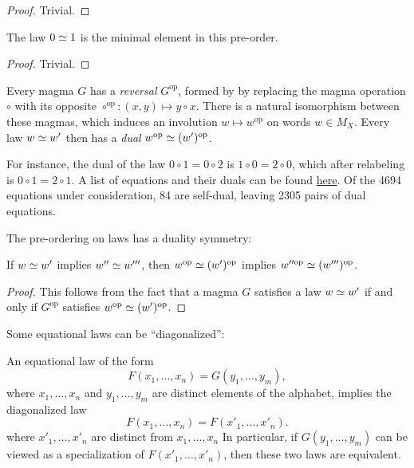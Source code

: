 \begin{proof} Trivial.
\end{proof}

\begin{lemma}\label{minimal}  The law $0  \simeq  1$ is the minimal element in this pre-order.
\end{lemma}

\begin{proof} Trivial.
\end{proof}

Every magma $G$ has a \emph{reversal} $G^{\mathrm{op}}$, formed by by replacing the magma operation $\circ$ with its opposite $\circ^{\mathrm{op}}:(x,y) \mapsto y \circ x$. There is a natural isomorphism between these magmas, which induces an involution $w \mapsto w^{\mathrm{op}}$ on words $w \in M_X$.  Every law $w  \simeq  w'$ then has a \emph{dual} $w^{\mathrm{op}}  \simeq  (w')^{\mathrm{op}}$.

For instance, the dual of the law $0 \circ 1 = 0 \circ 2$ is $1 \circ 0 = 2 \circ 0$, which after relabeling is $0 \circ 1 = 2 \circ 1$.  A list of equations and their duals can be found \href{https://github.com/teorth/equational_theories/blob/main/data/dual_equations.md}{here}.  Of the 4694 equations under consideration, 84 are self-dual, leaving 2305 pairs of dual equations.

The pre-ordering on laws has a duality symmetry:

\begin{lemma}\label{duality}  If $w  \simeq  w'$ implies $w''  \simeq  w'''$, then $w^{\mathrm{op}}  \simeq  (w')^{\mathrm{op}}$ implies $w''^{\mathrm{op}}  \simeq  (w''')^{\mathrm{op}}$.
\end{lemma}

\begin{proof} This follows from the fact that a magma $G$ satisfies a law $w  \simeq  w'$ if and only if $G^{\mathrm{op}}$ satisfies $w^{\mathrm{op}}  \simeq  (w')^{\mathrm{op}}$.
\end{proof}

Some equational laws can be ``diagonalized'':

\begin{theorem}[Diagonalization]\label{diag}  An equational law of the form
  \begin{equation}\label{prediag} F(x_1,\dots,x_n) = G(y_1,\dots,y_m),
  \end{equation}
  where $x_1,\dots,x_n$ and $y_1,\dots,y_m$ are distinct elements of the alphabet, implies the diagonalized law
$$ F(x_1,\dots,x_n) = F(x'_1,\dots,x'_n).$$
where $x'_1,\dots,x'_n$ are distinct from $x_1,\dots,x_n$
In particular, if $G(y_1,\dots,y_m)$ can be viewed as a specialization of $F(x'_1,\dots,x'_n)$, then these two laws are equivalent.
\end{theorem}

